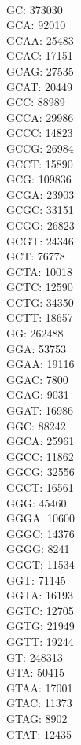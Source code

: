 \begin{multicols}{7}
\\ GC:	373030
\\ GCA:	92010
\\ GCAA:	25483
\\ GCAC:	17151
\\ GCAG:	27535
\\ GCAT:	20449
\\ GCC:	88989
\\ GCCA:	29986
\\ GCCC:	14823
\\ GCCG:	26984
\\ GCCT:	15890
\\ GCG:	109836
\\ GCGA:	23903
\\ GCGC:	33151
\\ GCGG:	26823
\\ GCGT:	24346
\\ GCT:	76778
\\ GCTA:	10018
\\ GCTC:	12590
\\ GCTG:	34350
\\ GCTT:	18657
\\ GG:	262488
\\ GGA:	53753
\\ GGAA:	19116
\\ GGAC:	7800
\\ GGAG:	9031
\\ GGAT:	16986
\\ GGC:	88242
\\ GGCA:	25961
\\ GGCC:	11862
\\ GGCG:	32556
\\ GGCT:	16561
\\ GGG:	45460
\\ GGGA:	10600
\\ GGGC:	14376
\\ GGGG:	8241
\\ GGGT:	11534
\\ GGT:	71145
\\ GGTA:	16193
\\ GGTC:	12705
\\ GGTG:	21949
\\ GGTT:	19244
\\ GT:	248313
\\ GTA:	50415
\\ GTAA:	17001
\\ GTAC:	11373
\\ GTAG:	8902
\\ GTAT:	12435

\end{multicols}
